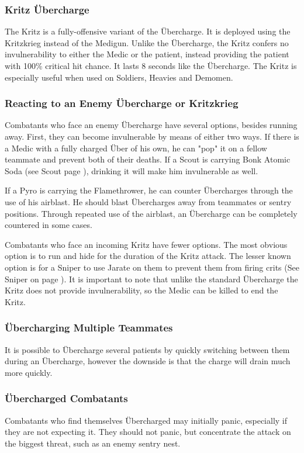 \subsubsection{Kritz Übercharge}
The Kritz is a fully-offensive variant of the Übercharge. It is deployed using the Kritzkrieg instead of the Medigun. Unlike the Übercharge, the Kritz confers no invulnerability to either the Medic or the patient, instead providing the patient with 100\% critical hit chance. It lasts 8 seconds like the Übercharge. The Kritz is especially useful when used on Soldiers, Heavies and Demomen.  

\subsubsection{Reacting to an Enemy Übercharge or Kritzkrieg}
Combatants who face an enemy Übercharge have several options, besides running away. First, they can become invulnerable by means of either two ways. If there is a Medic with a fully charged Über of his own, he can "pop" it on a fellow teammate and prevent both of their deaths. If a Scout is carrying Bonk Atomic Soda (see Scout page \pageref{Scout}), drinking it will make him invulnerable as well.

If a Pyro is carrying the Flamethrower, he can counter Übercharges through the use of his airblast.  He should blast Übercharges away from teammates or sentry positions.  Through repeated use of the airblast, an Übercharge can be completely countered in some cases.

\newpage

Combatants who face an incoming Kritz have fewer options. The most obvious option is to run and hide for the duration of the Kritz attack. The lesser known option is for a Sniper to use Jarate on them to prevent them from firing crits (See Sniper on page \pageref{Sniper}).  It is important to note that unlike the standard Übercharge the Kritz does not provide invulnerability, so the Medic can be killed to end the Kritz.

\subsubsection{Übercharging Multiple Teammates}
It is possible to Übercharge several patients by quickly switching between them during an Übercharge, however the downside is that the charge will drain much more quickly.

\subsubsection{Übercharged Combatants}
Combatants who find themselves Übercharged may initially panic, especially if they are not expecting it.  They should not panic, but concentrate the attack on the biggest threat, such as an enemy sentry nest.

